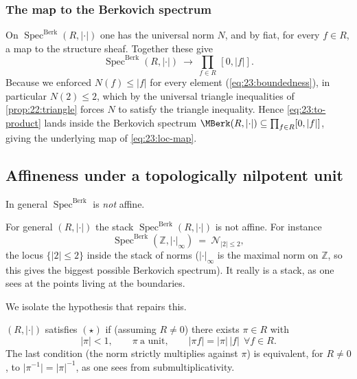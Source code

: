 \subsubsection*{The map to the Berkovich spectrum}

On $\operatorname{Spec}^{\mathrm{Berk}}(R,\lvert\cdot\rvert)$ one has the
universal norm $N$, and by fiat, for every $f\in R$, a map to the structure
sheaf. Together these give
\begin{equation}
\label{eq:23:to-product}
\operatorname{Spec}^{\mathrm{Berk}}(R,\lvert\cdot\rvert)\ \longrightarrow\
\prod_{f\in R}\,[0,\lvert f\rvert].
\end{equation}
Because we enforced $N(f)\le\lvert f\rvert$ for every element
(\eqref{eq:23:boundedness}), in particular $N(2)\le2$, which by the universal
triangle inequalities of \cref{prop:22:triangle} forces $N$ to satisfy the
triangle inequality. Hence \eqref{eq:23:to-product} lands inside the Berkovich
spectrum $\MBerk(R,\lvert\cdot\rvert)\subseteq\prod_{f\in R}[0,\lvert f\rvert]$,
giving the underlying map of \eqref{eq:23:loc-map}.

\subsection{Affineness under a topologically nilpotent unit}
\label{subsec:23:affine}

In general $\operatorname{Spec}^{\mathrm{Berk}}$ is \emph{not} affine.

\begin{example}
\label{ex:23:integers}
For general $(R,\lvert\cdot\rvert)$ the stack
$\operatorname{Spec}^{\mathrm{Berk}}(R,\lvert\cdot\rvert)$ is not affine. For
instance
\begin{equation*}
\operatorname{Spec}^{\mathrm{Berk}}(\mathbb Z,\lvert\cdot\rvert_\infty)
\ =\ \mathcal N_{\lvert2\rvert\le2},
\end{equation*}
the locus $\{\lvert2\rvert\le2\}$ inside the stack of norms
($\lvert\cdot\rvert_\infty$ is the maximal norm on $\mathbb Z$, so this gives the
biggest possible Berkovich spectrum). It really is a stack, as one sees at the
points living at the boundaries.
\end{example}

We isolate the hypothesis that repairs this.

\begin{definition}
\label{def:23:star}
$(R,\lvert\cdot\rvert)$ satisfies $(\star)$ if (assuming $R\ne0$) there exists
$\pi\in R$ with
\begin{equation*}
\lvert\pi\rvert<1,\qquad \pi\ \text{a unit},\qquad
\lvert\pi f\rvert=\lvert\pi\rvert\,\lvert f\rvert\ \ \forall f\in R .
\end{equation*}
The last condition (the norm strictly multiplies against $\pi$) is equivalent,
for $R\ne0$, to $\lvert\pi^{-1}\rvert=\lvert\pi\rvert^{-1}$, as one sees from
submultiplicativity.
\end{definition}

